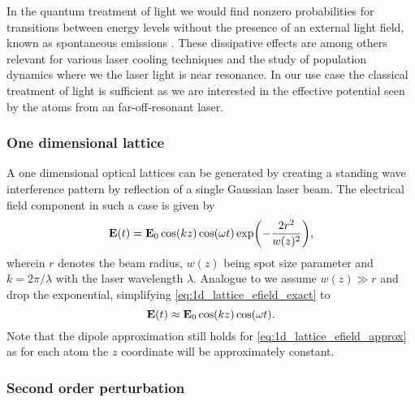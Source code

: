 In the quantum treatment of light we would find nonzero probabilities for
transitions between energy levels without the presence of an external light
field, known as spontaneous emissions \cite{Gerry2004}. These dissipative
effects are among others relevant for various laser cooling techniques and
the study of population dynamics where we the laser light is near resonance.
In our use case the classical treatment of light is sufficient as we are
interested in the effective potential seen by the atoms from an
far-off-resonant laser.

\subsubsection{One dimensional lattice}

A one dimensional optical lattices can be generated by creating a standing
wave interference pattern by reflection of a single Gaussian laser beam. The
electrical field component in such a case is given by
\begin{equation}
  \vb{E}(t)
  =\vb{E}_0\cos(kz)\cos(\omega t)\exp(-\frac{2r^2}{w(z)^2})
  \label{eq:1d_lattice_efield_exact},
\end{equation}
wherein $r$ denotes the beam radius, $w(z)$ being spot size parameter and
$k=2\pi/\lambda$ with the laser wavelength $\lambda$. Analogue to
\cite[p.127]{Rom2009} we assume $w(z)\gg r$ and drop the exponential,
simplifying \cref{eq:1d_lattice_efield_exact} to
\begin{equation}
  \vb{E}(t)
  \approx\vb{E}_0\cos(kz)\cos(\omega t)
  \label{eq:1d_lattice_efield_approx}.
\end{equation}
Note that the dipole approximation still holds for
\cref{eq:1d_lattice_efield_approx} as for each atom the $z$ coordinate
will be approximately constant.

\subsubsection{Second order perturbation}

